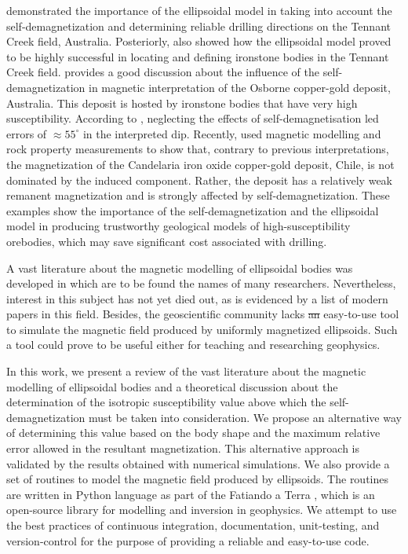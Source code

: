 \documentclass[gmd, manuscript]{copernicus}
\providecommand{\DIFadd}[1]{{\protect\color{blue}\uwave{#1}}} %
\providecommand{\DIFdel}[1]{{\protect\color{red}\sout{#1}}}                      %
\providecommand{\DIFaddbegin}{} %
\providecommand{\DIFaddend}{} %
\providecommand{\DIFdelbegin}{} %
\providecommand{\DIFdelend}{} %
\begin{document}
\citet{farrar1979} demonstrated the importance of the
ellipsoidal model in taking into account the
self-demagnetization and determining reliable
drilling directions on the Tennant Creek field,
Australia.
Posteriorly, \citet{hoschke1991} also showed how the
ellipsoidal model proved to be highly successful in
locating and defining ironstone bodies in the
Tennant Creek field.
\citet{clark2000} provides a good discussion about the
influence of the self-demagnetization in magnetic
interpretation of the Osborne copper-gold deposit,
Australia. This deposit is hosted by ironstone
bodies that have very high susceptibility.
According to \citet{clark2000}, neglecting the effects
of self-demagnetisation led errors of $\approx 55^{\circ}$
in the interpreted dip.
Recently, \citet{austin2014} used magnetic modelling
and rock property measurements to show that,
contrary to previous interpretations, the magnetization
of the Candelaria iron oxide copper-gold deposit,
Chile, is not dominated by the induced component.
Rather, the deposit has a relatively weak remanent
magnetization and is strongly affected by
self-demagnetization.
These examples show the importance of the self-demagnetization
and the ellipsoidal model in
producing trustworthy geological models of
high-susceptibility orebodies, which may save significant
cost associated with drilling.

A vast literature about the magnetic
modelling of ellipsoidal bodies was developed in which
are to be found the names of many researchers.
Nevertheless, interest in this subject has not yet died
out, as is evidenced by a list of modern papers in this
field.
Besides, the geoscientific community lacks \DIFdelbegin \DIFdel{an }\DIFdelend \DIFaddbegin \DIFadd{a free }\DIFaddend easy-to-use
tool to simulate the magnetic field produced by uniformly
magnetized ellipsoids.
Such a tool could prove to be useful either for teaching
and researching geophysics.

In this work, we present a review of the vast literature
about the magnetic modelling of ellipsoidal bodies and a
theoretical discussion about the determination of the
isotropic susceptibility value above which
the self-demagnetization must be taken into consideration.
We propose an alternative way of determining this value
based on the body shape and the maximum relative error
allowed in the resultant magnetization.
This alternative approach is validated
by the results obtained with numerical simulations.
We also provide a set of routines to
model the magnetic field produced by ellipsoids.
The routines are written in Python language as part of
the Fatiando a Terra \citep{uieda2013}, which is an
open-source library for modelling and inversion in geophysics.
We attempt to use the best practices of continuous
integration, documentation, unit-testing, and version-control
for the purpose of providing a reliable and easy-to-use
code.
\end{document}
